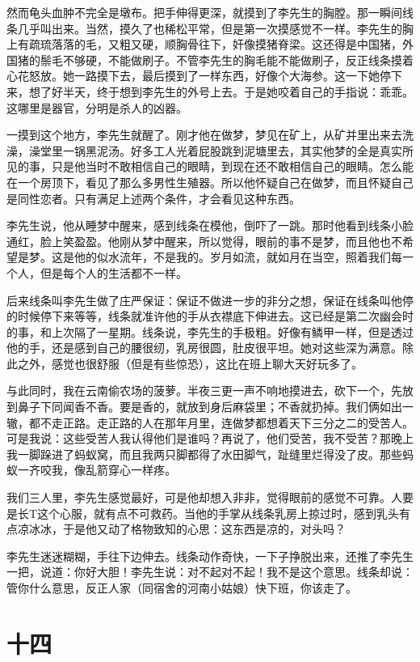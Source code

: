 然而龟头血肿不完全是墩布。把手伸得更深，就摸到了李先生的胸膛。那一瞬间线条几乎叫出来。当然，摸久了也稀松平常，但是第一次摸感觉不一样。李先生的胸上有疏琉落落的毛，又粗又硬，顺胸骨往下，奸像摸猪脊梁。这还得是中国猪，外国猪的鬃毛不够硬，不能做刷子。不管李先生的胸毛能不能做刷子，反正线条摸着心花怒放。她一路摸下去，最后摸到了一样东西，好像个大海参。这一下她停下来，想了好半天，终于想到李先生的外号上去。于是她咬着自己的手指说：乖乖。这哪里是器官，分明是杀人的凶器。 

一摸到这个地方，李先生就醒了。刚才他在做梦，梦见在矿上，从矿并里出来去洗澡，澡堂里一锅黑泥汤。好多工人光着屁股跳到泥塘里去，其实他梦的全是真实所见的事，只是他当时不敢相信自己的眼睛，到现在还不敢相信自己的眼睛。怎么能在一个房顶下，看见了那么多男性生殖器。所以他怀疑自己在做梦，而且怀疑自己是同性恋者。只有满足上述两个条件，才会看见这种东西。 

李先生说，他从睡梦中醒来，感到线条在模他，倒吓了一跳。那时他看到线条小脸通红，脸上笑盈盈。他刚从梦中醒来，所以觉得，眼前的事不是梦，而且他也不希望是梦。这是他的似水流年，不是我的。岁月如流，就如月在当空，照着我们每一个人，但是每个人的生活都不一样。 

后来线条叫李先生做了庄严保证：保证不做进一步的非分之想，保证在线条叫他停的时候停下来等等，线条就准许他的手从衣襟底下伸进去。这已经是第二次幽会时的事，和上次隔了一星期。线条说，李先生的手极粗。好像有鳞甲一样，但是透过他的手，还是感到自己的腰很纫，乳房很圆，肚皮很平坦。她对这些深为满意。除此之外，感觉也很舒服（但是有些惊恐），这比在班上聊大天好玩多了。 

与此同时，我在云南偷农场的菠萝。半夜三更一声不响地摸进去，砍下一个，先放到鼻子下同闻香不香。要是香的，就放到身后麻袋里；不香就扔掉。我们俩如出一辙，都不走正路。走正路的人在那年月里，连做梦都想着天下三分之二的受苦人。可是我说：这些受苦人我认得他们是谁吗？再说了，他们受苦，我不受苦？那晚上我一脚跺进了蚂蚁窝，而且我两只脚都得了水田脚气，趾缝里烂得没了皮。那些蚂蚁一齐咬我，像乱箭穿心一样疼。 

我们三人里，李先生感觉最好，可是他却想入非非，觉得眼前的感觉不可靠。人要是长T这个心服，就有点不可救药。当他的手掌从线条乳房上掠过时，感到乳头有点凉冰冰，于是他又动了格物致知的心思：这东西是凉的，对头吗？ 

李先生迷迷糊糊，手往下边伸去。线条动作奇快，一下子挣脱出来，还推了李先生一把，说道：你好大胆！李先生说：对不起对不起！我不是这个意思。线条却说：管你什么意思，反正人家（同宿舍的河南小姑娘）快下班，你该走了。

\section{十四}

